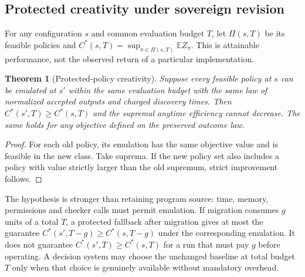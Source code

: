 \documentclass[11pt]{article}
\newtheorem{theorem}{Theorem}[section]\newtheorem{proposition}[theorem]{Proposition}\newtheorem{lemma}[theorem]{Lemma}\newtheorem{corollary}[theorem]{Corollary}
\theoremstyle{definition}\newtheorem{definition}[theorem]{Definition}\newtheorem{conjecture}[theorem]{Conjecture}\newtheorem{example}[theorem]{Example}
\newcommand{\E}{\mathbb E}\newcommand{\Prb}{\mathbb P}\newcommand{\N}{\mathbb N}\newcommand{\PC}{\operatorname{PC}}\newcommand{\K}{\mathcal K}\newcommand{\T}{\mathcal T}\newcommand{\F}{\mathcal F}\newcommand{\ind}{\mathbf 1}\newcommand{\cost}{\operatorname{cost}}
\begin{document}
\subsection{Protected creativity under sovereign revision}
For any configuration $s$ and common evaluation budget $T$, let $\Pi(s,T)$ be its feasible policies and $C^*(s,T)=\sup_{\pi\in\Pi(s,T)}\E Z_\pi$. This is attainable performance, not the observed return of a particular implementation.
\begin{theorem}[Protected-policy creativity]
Suppose every feasible policy at $s$ can be emulated at $s'$ within the same evaluation budget with the same law of normalized accepted outputs and charged discovery times. Then $C^*(s',T)\geq C^*(s,T)$ and the supremal anytime efficiency cannot decrease. The same holds for any objective defined on the preserved outcome law.
\end{theorem}
\begin{proof}For each old policy, its emulation has the same objective value and is feasible in the new class. Take suprema. If the new policy set also includes a policy with value strictly larger than the old supremum, strict improvement follows.\end{proof}
The hypothesis is stronger than retaining program source: time, memory, permissions and checker calls must permit emulation. If migration consumes $g$ units of a total $T$, a protected fallback after migration gives at most the guarantee $C^*(s',T-g)\ge C^*(s,T-g)$ under the corresponding emulation. It does not guarantee $C^*(s',T)\ge C^*(s,T)$ for a run that must pay $g$ before operating. A decision system may choose the unchanged baseline at total budget $T$ only when that choice is genuinely available without mandatory overhead.
\end{document}
